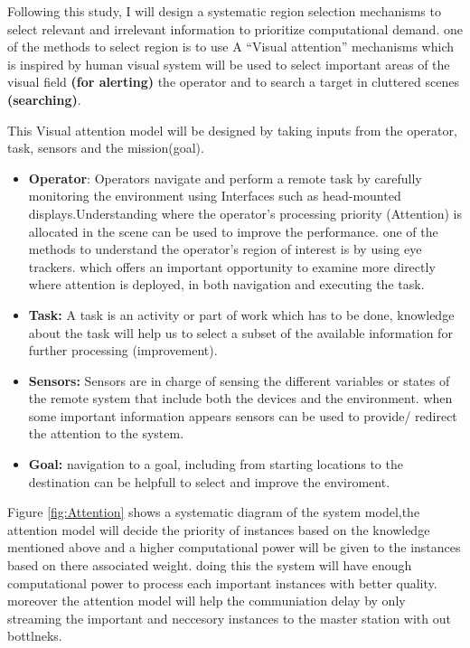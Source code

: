 Following this study, I will design a systematic region selection mechanisms to select relevant and irrelevant information to prioritize computational demand. one of the methods to select region is to use A “Visual attention” mechanisms which is inspired by human visual system will be used to select important areas of the visual field \textbf{(for alerting)} the operator and to search a target in cluttered scenes \textbf{(searching)}. 

This Visual attention model will be designed by taking inputs from the operator, task, sensors and the mission(goal). 

\begin{itemize}
    \item \textbf{Operator}: Operators navigate and perform a remote task by carefully monitoring the environment using Interfaces such as head-mounted displays.Understanding where the operator's processing priority (Attention) is allocated in the scene can be used to improve the performance. one of the methods to understand the operator's region of interest is by using eye trackers. which offers an important opportunity to examine more directly where attention is deployed, in both navigation and executing the task.
    \item \textbf{Task:} A task is an activity or part of work which has to be done, knowledge about the task will help us to select a subset of the available information for further processing (improvement).
    \item \textbf{Sensors:} Sensors are in charge of sensing the different variables or states of the remote system that include both the devices and the environment. when some important information appears sensors can be used to provide/ redirect the attention to the system.
    \item \textbf{Goal:} navigation to a goal, including from starting locations to the destination can be helpfull to select and improve the enviroment. 
\end{itemize}

Figure \ref{fig:Attention} shows a systematic diagram of the system model,the attention model will decide the priority of instances based on the knowledge mentioned above and a higher computational power will be given to the instances based on there associated weight. doing this the system will have enough computational power to process each important instances with better quality. moreover the attention model will help the communiation delay by only streaming the important and neccesory instances to the master station with out bottlneks. 

